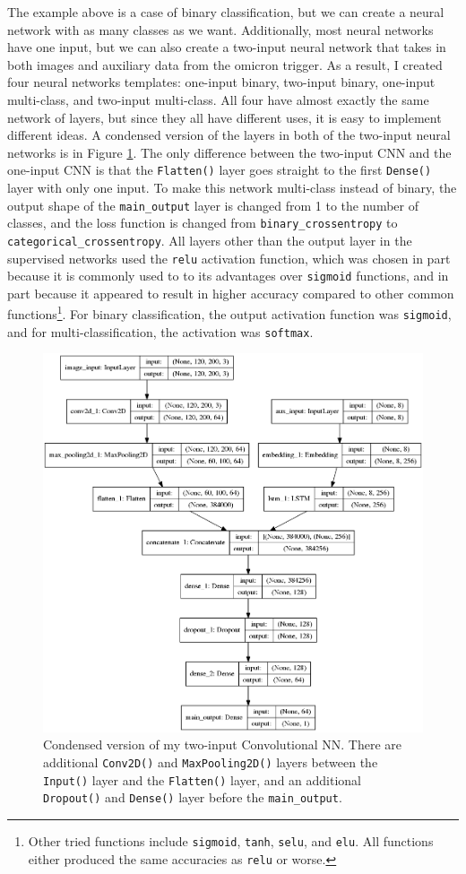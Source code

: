 \documentclass[a4paper]{article}
\begin{document}
The example above is a case of binary classification, but we can create a neural network with as many classes as we want. Additionally, most neural networks have one input, but we can also create a two-input neural network that takes in both images and auxiliary data from the omicron trigger. As a result, I created four neural networks templates: one-input binary, two-input binary, one-input multi-class, and two-input multi-class. All four have almost exactly the same network of layers, but since they all have different uses, it is easy to implement different ideas. A condensed version of the layers in both of the two-input neural networks is in Figure \ref{fig:sup_condensed}. The only difference between the two-input CNN and the one-input CNN is that the \texttt{Flatten()} layer goes straight to the first \texttt{Dense()} layer with only one input. To make this network multi-class instead of binary, the output shape of the \texttt{main\_output} layer is changed from 1 to the number of classes, and the loss function is changed from \texttt{binary\_crossentropy} to \texttt{categorical\_crossentropy}. All layers other than the output layer in the supervised networks used the \texttt{relu} activation function, which was chosen in part because it is commonly used to to its advantages over \texttt{sigmoid} functions, and in part because it appeared to result in higher accuracy compared to other common functions\footnote{Other tried functions include \texttt{sigmoid}, \texttt{tanh}, \texttt{selu}, and \texttt{elu}. All functions either produced the same accuracies as \texttt{relu} or worse.}. For binary classification, the output activation function was \texttt{sigmoid}, and for multi-classification, the activation was \texttt{softmax}.

\begin{figure}[h!]
	\centering
	\includegraphics[width=.5\linewidth]{sup_condensed}
	\caption{Condensed version of my two-input Convolutional NN. There are additional \texttt{Conv2D()} and \texttt{MaxPooling2D()} layers between the \texttt{Input()} layer and the \texttt{Flatten()} layer, and an additional \texttt{Dropout()} and \texttt{Dense()} layer before the \texttt{main\_output}.}
	\label{fig:sup_condensed}
\end{figure}
\end{document}
